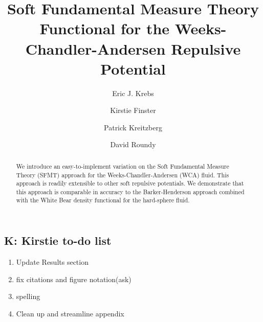 \documentclass[letterpaper,twocolumn,amsmath,amssymb,prb]{revtex4-1}
\newcommand\kirstiesays[1]{{\bf \color{red}K: #1}}
\begin{document}
\title{Soft Fundamental Measure Theory Functional for the
  Weeks-Chandler-Andersen Repulsive Potential}

\author{Eric J. Krebs}

\author{Kirstie Finster}

\author{Patrick Kreitzberg}

\author{David Roundy}

\begin{abstract}
  We introduce an easy-to-implement variation on the Soft Fundamental
  Measure Theory (SFMT) approach for the Weeks-Chandler-Andersen (WCA)
  fluid.  This approach is readily extensible to other soft repulsive
  potentials.  We demonstrate that this approach is comparable in
  accuracy to the Barker-Henderson approach combined with the White
  Bear density functional for the hard-sphere fluid.
\end{abstract}

\maketitle



\subsection{\kirstiesays{Kirstie to-do list}}
\begin{enumerate}
\item Update Results section 
\item fix citations and figure notation(ask)%
\item spelling
\item Clean up and streamline appendix
\end{enumerate}
\end{document}
